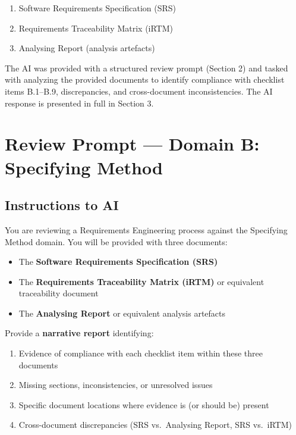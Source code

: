 \documentclass[11pt,a4paper]{article}
\begin{document}
\begin{enumerate}
\item Software Requirements Specification (SRS)
\item Requirements Traceability Matrix (iRTM)
\item Analysing Report (analysis artefacts)
\end{enumerate}

The AI was provided with a structured review prompt (Section 2) and tasked with analyzing the provided documents to identify compliance with checklist items B.1--B.9, discrepancies, and cross-document inconsistencies. The AI response is presented in full in Section 3.

\newpage
\section{Review Prompt --- Domain B: Specifying Method}

\subsection*{Instructions to AI}

You are reviewing a Requirements Engineering process against the Specifying Method domain. You will be provided with three documents:

\begin{itemize}
\item The \textbf{Software Requirements Specification (SRS)}
\item The \textbf{Requirements Traceability Matrix (iRTM)} or equivalent traceability document
\item The \textbf{Analysing Report} or equivalent analysis artefacts
\end{itemize}

Provide a \textbf{narrative report} identifying:

\begin{enumerate}
\item Evidence of compliance with each checklist item within these three documents
\item Missing sections, inconsistencies, or unresolved issues
\item Specific document locations where evidence is (or should be) present
\item Cross-document discrepancies (SRS vs.\ Analysing Report, SRS vs.\ iRTM)
\end{enumerate}
\end{document}
